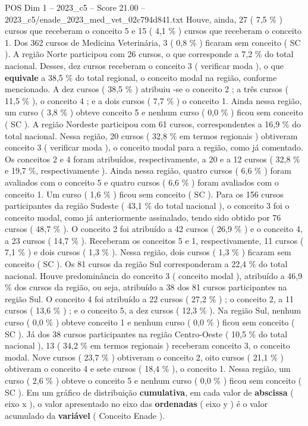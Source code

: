 \begin{textsample}{POS Dim 1 – 2023\_c5 – Score 21.00 – 2023\_c5/enade\_2023\_med\_vet\_02c794d841.txt}
Houve, ainda, 27 ( 7,5 \% ) cursos que receberam o conceito 5 e 15 ( 4,1 \% ) cursos que receberam o conceito 1.
Dos 362 cursos de Medicina Veterinária, 3 ( 0,8 \% ) ficaram sem conceito ( SC ).
A região Norte participou com 26 cursos, o que corresponde a 7,2 \% do total nacional.
Desses, dez cursos receberam o conceito 3 ( verificar moda ), o que \textbf{equivale} a 38,5 \% do total regional, o conceito modal na região, conforme mencionado.
A dez cursos ( 38,5 \% ) atribuiu -se o conceito 2 ; a três cursos ( 11,5 \% ), o conceito 4 ; e a dois cursos ( 7,7 \% ) o conceito 1.
Ainda nessa região, um curso ( 3,8 \% ) obteve conceito 5 e nenhum curso ( 0,0 \% ) ficou sem conceito ( SC ).
A região Nordeste participou com 61 cursos, correspondentes a 16,9 \% do total nacional.
Nessa região, 20 cursos ( 32,8 \% em termos regionais ) obtiveram conceito 3 ( verificar moda ), o conceito modal para a região, como já comentado.
Os conceitos 2 e 4 foram atribuídos, respectivamente, a 20 e a 12 cursos ( 32,8 \% e 19,7 \%, respectivamente ).
Ainda nessa região, quatro cursos ( 6,6 \% ) foram avaliados com o conceito 5 e quatro cursos ( 6,6 \% ) foram avaliados com o conceito 1.
Um curso ( 1,6 \% ) ficou sem conceito ( SC ).
Para os 156 cursos participantes da região Sudeste ( 43,1 \% do total nacional ), o conceito 3 foi o conceito modal, como já anteriormente assinalado, tendo sido obtido por 76 cursos ( 48,7 \% ).
O conceito 2 foi atribuído a 42 cursos ( 26,9 \% ) e o conceito 4, a 23 cursos ( 14,7 \% ).
Receberam os conceitos 5 e 1, respectivamente, 11 cursos ( 7,1 \% ) e dois cursos ( 1,3 \% ).
Nessa região, dois cursos ( 1,3 \% ) ficaram sem conceito ( SC ).
Os 81 cursos da região Sul corresponderam a 22,4 \% do total nacional.
Houve predominância do conceito 3 ( conceito modal ), atribuído a 46,9 \% dos cursos da região, ou seja, atribuído a 38 dos 81 cursos participantes na região Sul.
O conceito 4 foi atribuído a 22 cursos ( 27,2 \% ) ; o conceito 2, a 11 cursos ( 13,6 \% ) ; e o conceito 5, a dez cursos ( 12,3 \% ).
Na região Sul, nenhum curso ( 0,0 \% ) obteve conceito 1 e nenhum curso ( 0,0 \% ) ficou sem conceito ( SC ).
Já dos 38 cursos participantes na região Centro-Oeste ( 10,5 \% do total nacional ), 13 ( 34,2 \% em termos regionais ) receberam conceito 3, o conceito modal.
Nove cursos ( 23,7 \% ) obtiveram o conceito 2, oito cursos ( 21,1 \% ) obtiveram o conceito 4 e sete cursos ( 18,4 \% ), o conceito 1.
Nessa região, um curso ( 2,6 \% ) obteve o conceito 5 e nenhum curso ( 0,0 \% ) ficou sem conceito ( SC ).
Em um gráfico de distribuição \textbf{cumulativa}, em cada valor de \textbf{abscissa} ( eixo x ), o valor apresentado no eixo das \textbf{ordenadas} ( eixo y ) é o valor acumulado da \textbf{variável} ( Conceito Enade ).

\end{textsample}
